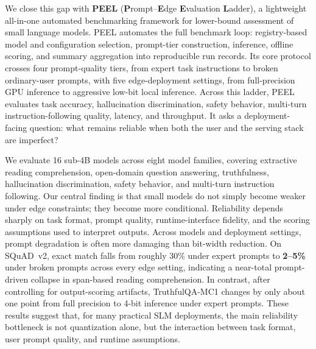 \documentclass[letterpaper]{article} %
\begin{document}
We close this gap with \textbf{PEEL} (\textbf{P}rompt--\textbf{E}dge \textbf{E}valuation \textbf{L}adder), a lightweight all-in-one automated benchmarking framework for lower-bound assessment of small language models. PEEL automates the full benchmark loop: registry-based model and configuration selection, prompt-tier construction, inference, offline scoring, and summary aggregation into reproducible run records. Its core protocol crosses four prompt-quality tiers, from expert task instructions to broken ordinary-user prompts, with five edge-deployment settings, from full-precision GPU inference to aggressive low-bit local inference. Across this ladder, PEEL evaluates task accuracy, hallucination discrimination, safety behavior, multi-turn instruction-following quality, latency, and throughput. It asks a deployment-facing question: what remains reliable when both the user and the serving stack are imperfect?

We evaluate 16 sub-4B models across eight model families, covering extractive reading comprehension, open-domain question answering, truthfulness, hallucination discrimination, safety behavior, and multi-turn instruction following. Our central finding is that small models do not simply become weaker under edge constraints; they become more conditional. Reliability depends sharply on task format, prompt quality, runtime-interface fidelity, and the scoring assumptions used to interpret outputs. Across models and deployment settings, prompt degradation is often more damaging than bit-width reduction. On SQuAD~v2, exact match falls from roughly 30\% under expert prompts to \textbf{2--5\%} under broken prompts across every edge setting, indicating a near-total prompt-driven collapse in span-based reading comprehension. In contrast, after controlling for output-scoring artifacts, TruthfulQA-MC1 changes by only about one point from full precision to 4-bit inference under expert prompts. These results suggest that, for many practical SLM deployments, the main reliability bottleneck is not quantization alone, but the interaction between task format, user prompt quality, and runtime assumptions.
\end{document}
